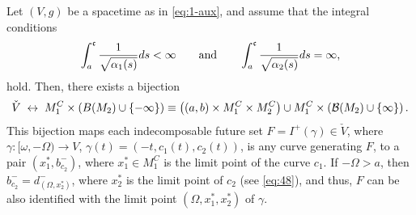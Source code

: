\begin{thm}\label{pfuturecomploneinfinite}
  Let $(V,g)$ be a  {\multiwarped} spacetime as in \eqref{eq:1-aux}, and assume that the integral conditions
  \begin{equation}
  \label{eqq:9}
 \int_{a}^{\mathfrak{c}}\frac{1}{\sqrt{\alpha_1(s)}}ds<\infty \qquad \hbox{and}\qquad \int_{a}^{\mathfrak{c}}\frac{1}{\sqrt{\alpha_2(s)}}ds=\infty,
\end{equation}
hold. Then, there exists a bijection
 \begin{equation}
   \label{eqq:10}
     \check{V}\; \leftrightarrow\;  M_1^C\times \left(B(M_2)\cup \{-\infty\}\right)
     \equiv  \left( (a,b)\times M_1^C\times M_2^C\right) \cup M_{1}^{C} \times \left({\cal B}(M_2)\cup \{\infty\}\right).
  \end{equation}
  This bijection maps each indecomposable future set $F=I^+(\gamma)\in \check{V}$, where $\gamma:[\omega,-\Omega)\rightarrow V$, $\gamma(t)=(-t,c_1(t),c_2(t))$, is any curve generating $F$, to a pair $(x_1^*,b^-_{c_2})$, where $x_1^*\in M_1^C$ is the limit point of the curve $c_1$. If $-\Omega>a$, then  $b^-_{c_2}=d^-_{(\Omega,x_2^*)}$, where $x_2^*$ is the limit point of $c_2$ (see \eqref{eq:48}), and thus, $F$ can be also identified with the limit point $(\Omega,x_1^*,x_2^*)$ of $\gamma$.
\end{thm}

